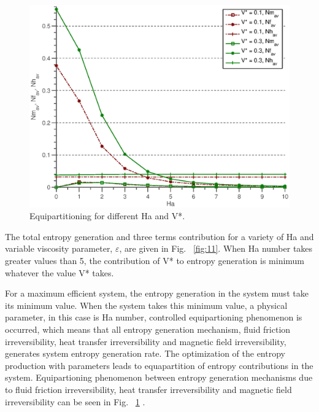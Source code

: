 \begin{figure}
  \includegraphics[scale=0.8]{figures/fig12.eps}
\vspace*{6mm}
\caption{Equipartitioning for different Ha and V*.}
\label{fig:12}       %
\end{figure}

The total entropy generation and three terms contribution for a variety of Ha and variable viscosity parameter, $\varepsilon $, are given in Fig. ~\ref{fig:11}. When Ha number takes greater values than 5, the contribution of V* to entropy generation is minimum whatever the value V* takes.


For a maximum efficient system, the entropy generation in the system must take its minimum value. When the system takes this minimum value, a physical parameter, in this case is Ha number, controlled equipartioning phenomenon is occurred, which means that all entropy generation mechanism, fluid friction irreversibility, heat transfer irreversibility and magnetic field irreversibility, generates system entropy generation rate.  The optimization of the entropy production with parameters leads to equapartition of entropy contributions in the system. Equipartioning phenomenon between entropy generation mechanisms due to fluid friction irreversibility, heat transfer irreversibility and magnetic field irreversibility can be seen in Fig. ~\ref{fig:12} \cite{ArikogluEffect,BedeauxOptimization}.


